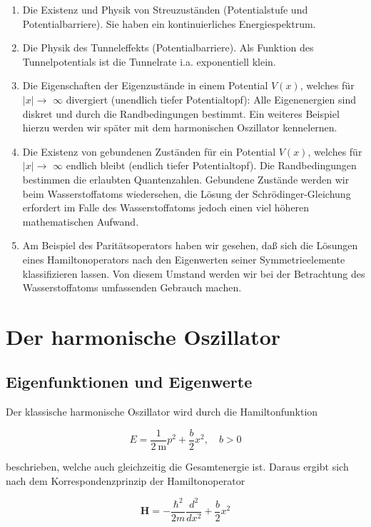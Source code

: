 \documentclass[10pt, letterpaper]{article}
\begin{document}
\begin{enumerate}
  \item Die Existenz und Physik von Streuzuständen (Potentialstufe und Potentialbarriere). Sie haben ein kontinuierliches Energiespektrum.
  \item Die Physik des Tunneleffekts (Potentialbarriere). Als Funktion des Tunnelpotentials ist die Tunnelrate i.a. exponentiell klein.
  \item Die Eigenschaften der Eigenzustände in einem Potential $V(x)$, welches für $|x| \rightarrow$ $\infty$ divergiert (unendlich tiefer Potentialtopf): Alle Eigenenergien sind diskret und durch die Randbedingungen bestimmt. Ein weiteres Beispiel hierzu werden wir später mit dem harmonischen Oszillator kennelernen.
  \item Die Existenz von gebundenen Zuständen für ein Potential $V(x)$, welches für $|x| \rightarrow$ $\infty$ endlich bleibt (endlich tiefer Potentialtopf). Die Randbedingungen bestimmen die erlaubten Quantenzahlen. Gebundene Zustände werden wir beim Wasserstoffatoms wiedersehen, die Lösung der Schrödinger-Gleichung erfordert im Falle des Wasserstoffatoms jedoch einen viel höheren mathematischen Aufwand.
  \item Am Beispiel des Paritätsoperators haben wir gesehen, daß sich die Lösungen eines Hamiltonoperators nach den Eigenwerten seiner Symmetrieelemente klassifizieren lassen. Von diesem Umstand werden wir bei der Betrachtung des Wasserstoffatoms umfassenden Gebrauch machen.
\end{enumerate}


\pagebreak


\section{Der harmonische Oszillator}

\subsection*{Eigenfunktionen und Eigenwerte}
Der klassische harmonische Oszillator wird durch die Hamiltonfunktion

$$
E=\frac{1}{2 \mathrm{~m}} p^{2}+\frac{b}{2} x^{2}, \quad b>0
$$

beschrieben, welche auch gleichzeitig die Gesamtenergie ist. Daraus ergibt sich nach dem Korrespondenzprinzip der Hamiltonoperator

$$
\mathbf{H}=-\frac{\hbar^{2}}{2 m} \frac{d^{2}}{d x^{2}}+\frac{b}{2} x^{2}
$$
\end{document}
